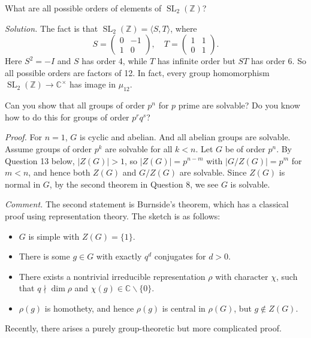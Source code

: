 \documentclass{mathproblems}
\newcommand\C{\mathbb{C}}
\newcommand\Z{\mathbb{Z}}
\begin{document}
\begin{questions}

\miquestion
{\color{blue} What are all possible orders of elements of $\operatorname{SL}_2(\Z)$?}

\textit{Solution.} The fact is that $\operatorname{SL}_2(\Z)=\langle S,T\rangle$, where
$$
S=\begin{pmatrix} 0 & -1 \\ 1 & 0\end{pmatrix},\quad T=\begin{pmatrix} 1 & 1 \\ 0 & 1\end{pmatrix}.
$$
Here $S^2=-I$ and $S$ has order 4, while $T$ has infinite order but $ST$ has order 6. So all possible orders are factors of 12. In fact, every group homomorphism $\operatorname{SL}_2(\Z)\to \mathbb{C}^\times$ has image in $\mu_{12}$.


\miquestion
{\color{blue} Can you show that all groups of order $p^n$ for $p$ prime are solvable? Do you know how to do this for groups of order $p^rq^s$?}

\textit{Proof.} For $n=1$, $G$ is cyclic and abelian. And all abelian groups are solvable. Assume groups of order $p^k$ are solvable for all $k<n$. Let $G$ be of order $p^n$. By Question 13 below, $|Z(G)|>1$, so $|Z(G)|=p^{n-m}$ with $|G/Z(G)|=p^m$ for $m<n$, and hence both $Z(G)$ and $G/Z(G)$ are solvable. Since $Z(G)$ is normal in $G$, by the second theorem in Question 8, we see $G$ is solvable. 

\textit{Comment.} The second statement is Burnside's theorem, which has a classical proof using representation theory. The sketch is as follows: \vspace{-4pt}
\begin{itemize}
\item $G$ is simple with $Z(G)=\{1\}$.
\item There is some $g\in G$ with exactly $q^d$ conjugates for $d>0$.
\item There exists a nontrivial irreducible representation $\rho$ with character $\chi$, such that $q\nmid \dim \rho$ and $\chi(g)\in\C\backslash\{0\}$.
\item $\rho(g)$ is homothety, and hence $\rho(g)$ is central in $\rho(G)$, but $g\notin Z(G)$.
\end{itemize}
\vspace{-4pt}
Recently, there arises a purely group-theoretic but more complicated proof.


\end{questions}
\end{document}
